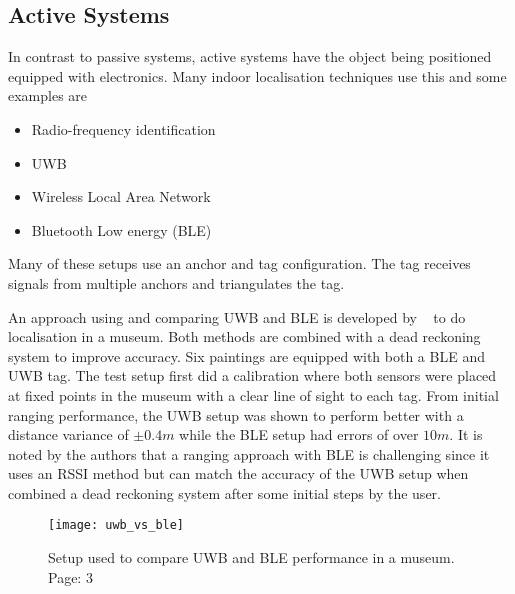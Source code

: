 \subsection{Active Systems}
In contrast to passive systems, active systems have the object being positioned equipped with electronics.
Many indoor localisation techniques use this and some examples are ~\citep{deak2012survey}
\begin{itemize}
    \item Radio-frequency identification
    \item UWB
    \item Wireless Local Area Network
    \item Bluetooth Low energy (BLE)
\end{itemize}
Many of these setups use an anchor and tag configuration.
The tag receives signals from multiple anchors and triangulates the tag.

An approach using and comparing UWB and BLE is developed by ~\cite{findobjs} to do localisation in a museum.
Both methods are combined with a dead reckoning system to improve accuracy.
Six paintings are equipped with both a BLE and UWB tag.
The test setup first did a calibration where both sensors were placed at fixed points in the museum with a clear line of sight to each tag.
From initial ranging performance, the UWB setup was shown to perform better with a distance variance of $\pm0.4m$ while the BLE setup had errors of over $10m$.
It is noted by the authors that a ranging approach with BLE is challenging since it uses an RSSI method but can match the accuracy of the UWB setup when combined a dead reckoning system after some initial steps by the user.

\begin{figure}[h!]
    \centering
    \texttt{[image: uwb\_vs\_ble]}
    \caption{Setup used to compare UWB and BLE performance in a museum. \cite{findobjs} Page: 3}
    \label{fig:uwbvsble}
\end{figure}

